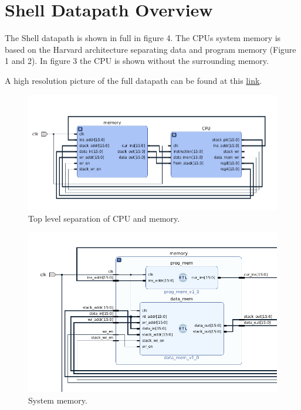 \documentclass{article}
\begin{document}
\section{Shell Datapath Overview}
\label{overview}
\begin{par}
	The Shell datapath is shown in full in figure 4. The CPUs system memory is based on the Harvard architecture separating data and program memory (Figure 1 and 2). In figure 3 the CPU is shown without the surrounding memory. 
	
	A high resolution picture of the full datapath can be found at this \href{https://raw.githubusercontent.com/RiceShelley/ELEC-5200/master/blockD.png}{link}.
	
	\begin{figure}[H]
		\centering
		\includegraphics[width=5in]{img/system_ov.png}
		\caption{Top level separation of CPU and memory.}
	\end{figure}

		\begin{figure}[H]
		\centering
		\includegraphics[width=6in]{img/sysmem.png}
		\caption{System memory.}
	\end{figure}
	

\end{par}
\end{document}
